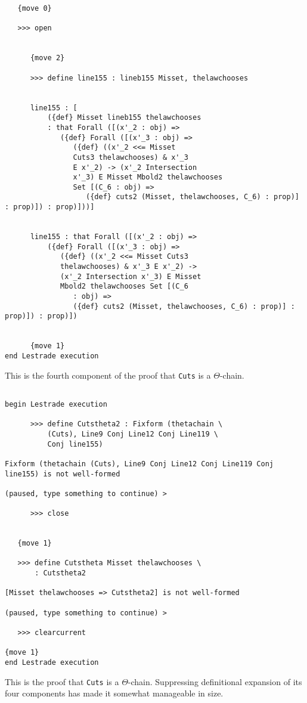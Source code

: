 \documentclass[12pt]{article}
\begin{document}
\begin{verbatim}
   {move 0}

   >>> open


      {move 2}

      >>> define line155 : lineb155 Misset, thelawchooses


      line155 : [
          ({def} Misset lineb155 thelawchooses 
          : that Forall ([(x'_2 : obj) => 
             ({def} Forall ([(x'_3 : obj) => 
                ({def} ((x'_2 <<= Misset 
                Cuts3 thelawchooses) & x'_3 
                E x'_2) -> (x'_2 Intersection 
                x'_3) E Misset Mbold2 thelawchooses 
                Set [(C_6 : obj) => 
                   ({def} cuts2 (Misset, thelawchooses, C_6) : prop)] : prop)]) : prop)]))]


      line155 : that Forall ([(x'_2 : obj) => 
          ({def} Forall ([(x'_3 : obj) => 
             ({def} ((x'_2 <<= Misset Cuts3 
             thelawchooses) & x'_3 E x'_2) -> 
             (x'_2 Intersection x'_3) E Misset 
             Mbold2 thelawchooses Set [(C_6 
                : obj) => 
                ({def} cuts2 (Misset, thelawchooses, C_6) : prop)] : prop)]) : prop)])


      {move 1}
end Lestrade execution
\end{verbatim}

This is the fourth component of the proof that {\tt Cuts} is a $\Theta$-chain.

\begin{verbatim}

begin Lestrade execution

      >>> define Cutstheta2 : Fixform (thetachain \
          (Cuts), Line9 Conj Line12 Conj Line119 \
          Conj line155)

Fixform (thetachain (Cuts), Line9 Conj Line12 Conj Line119 Conj line155) is not well-formed

(paused, type something to continue) >

      >>> close


   {move 1}

   >>> define Cutstheta Misset thelawchooses \
       : Cutstheta2

[Misset thelawchooses => Cutstheta2] is not well-formed

(paused, type something to continue) >

   >>> clearcurrent

{move 1}
end Lestrade execution
\end{verbatim}

This is the proof that {\tt Cuts} is a $\Theta$-chain.  Suppressing definitional expansion of its four components has made it somewhat manageable in size.
\end{document}
